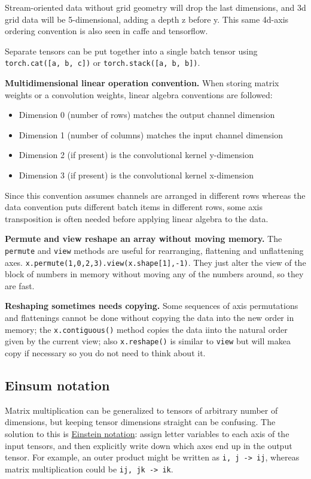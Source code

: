 Stream-oriented data without grid geometry will drop the last dimensions, and 3d grid data will be 5-dimensional, adding a depth z before y.  This same 4d-axis ordering convention is also seen in caffe and tensorflow.

Separate tensors can be put together into a single batch tensor using \texttt{torch.cat([a, b, c])} or \texttt{torch.stack([a, b, b])}.

\textbf{Multidimensional linear operation convention.} When storing matrix weights or a convolution weights, linear algebra conventions are followed:
\begin{itemize}
    \item Dimension 0 (number of rows) matches the output channel dimension
    \item Dimension 1 (number of columns) matches the input channel dimension
    \item Dimension 2 (if present) is the convolutional kernel y-dimension
    \item Dimension 3 (if present) is the convolutional kernel x-dimension
\end{itemize}

Since this convention assumes channels are arranged in different rows whereas the data convention puts different batch items in different rows, some axis transposition is often needed before applying linear algebra to the data.

\textbf{Permute and view reshape an array without moving memory.} The \texttt{permute} and \texttt{view} methods are useful for rearranging, flattening and unflattening axes. \texttt{x.permute(1,0,2,3).view(x.shape[1],-1)}. They just alter the view of the block of numbers in memory without moving any of the numbers around, so they are fast.

\textbf{Reshaping sometimes needs copying.} Some sequences of axis permutations and flattenings cannot be done without copying the data into the new order in memory; the \texttt{x.contiguous()} method copies the data iinto the natural order given by the current view; also \texttt{x.reshape()} is similar to \texttt{view} but will makea copy if necessary so you do not need to think about it.

\subsection{Einsum notation}

Matrix multiplication can be generalized to tensors of arbitrary number of dimensions, but keeping tensor dimensions straight can be confusing. The solution to this is \href{https://en.wikipedia.org/wiki/Einstein_notation}{Einstein notation}: assign letter variables to each axis of the input tensors, and then explicitly write down which axes end up in the output tensor.  For example, an outer product might be written as \texttt{i, j -> ij}, whereas matrix multiplication could be \texttt{ij, jk -> ik}.

